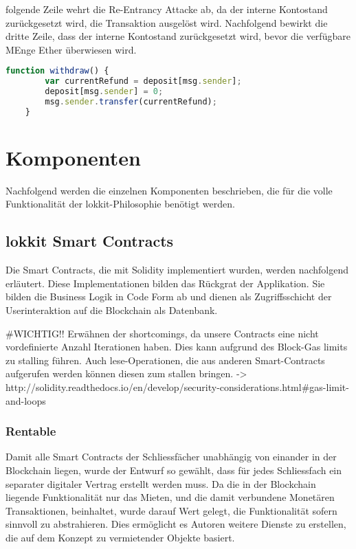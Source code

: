 folgende Zeile wehrt die Re-Entrancy Attacke ab, da der interne Kontostand zurückgesetzt wird, die Transaktion ausgelöst wird.
Nachfolgend bewirkt die dritte Zeile, dass der interne Kontostand zurückgesetzt wird, bevor die verfügbare MEnge Ether überwiesen wird.
\begin{lstlisting}[language=javascript,caption=empfohlenes Code Snippet]
    function withdraw() {
        var currentRefund = deposit[msg.sender];
        deposit[msg.sender] = 0;
        msg.sender.transfer(currentRefund);
    }
\end{lstlisting}

\section{Komponenten}
\label{sec:Komponenten}
Nachfolgend werden die einzelnen Komponenten beschrieben, die für die volle Funktionalität der lokkit-Philosophie benötigt werden.

\subsection{lokkit Smart Contracts}
\label{subsec:lokkit_Smart_Contracts}
Die Smart Contracts, die mit Solidity implementiert wurden, werden nachfolgend erläutert. Diese Implementationen bilden das Rückgrat der Applikation. Sie bilden die Business Logik in Code Form ab und dienen als Zugriffsschicht der Userinteraktion auf die Blockchain als Datenbank.

\#WICHTIG!!
Erwähnen der shortcomings, da unsere Contracts eine nicht vordefinierte Anzahl Iterationen haben. Dies kann aufgrund des Block-Gas limits zu stalling führen. Auch lese-Operationen, die aus anderen Smart-Contracts aufgerufen werden können diesen zum stallen bringen. -> http://solidity.readthedocs.io/en/develop/security-considerations.html\#gas-limit-and-loops

\subsubsection{Rentable}
\label{subsec:Rentable}
Damit alle Smart Contracts der Schliessfächer unabhängig von einander in der Blockchain liegen, wurde der Entwurf so gewählt, dass für jedes Schliessfach ein separater digitaler Vertrag erstellt werden muss. Da die in der Blockchain liegende Funktionalität nur das Mieten, und die damit verbundene Monetären Transaktionen, beinhaltet, wurde darauf Wert gelegt, die Funktionalität sofern sinnvoll zu abstrahieren. Dies ermöglicht es Autoren weitere Dienste zu erstellen, die auf dem Konzept zu vermietender Objekte basiert.
